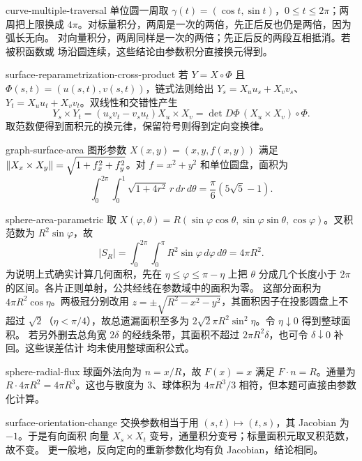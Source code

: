 \begin{solution}{curve-multiple-traversal}
单位圆一周取 $\gamma(t)=(\cos t,\sin t)$，$0\le t\le2\pi$；两周把上限换成
$4\pi$。对标量积分，两周是一次的两倍，先正后反也仍是两倍，因为弧长无向。
对向量积分，两周同样是一次的两倍；先正后反的两段互相抵消。若被积函数或
场沿圆连续，这些结论由参数积分直接换元得到。
\end{solution}

\begin{solution}{surface-reparametrization-cross-product}
若 $Y=X\circ\Phi$ 且 $\Phi(s,t)=(u(s,t),v(s,t))$，链式法则给出
$Y_s=X_u u_s+X_vv_s$、$Y_t=X_u u_t+X_vv_t$。双线性和交错性产生
\[
 Y_s\times Y_t=(u_sv_t-v_su_t)X_u\times X_v
 =\det D\Phi\,(X_u\times X_v)\circ\Phi.
\]
取范数便得到面积元的换元律，保留符号则得到定向变换律。
\end{solution}

\begin{solution}{graph-surface-area}
图形参数 $X(x,y)=(x,y,f(x,y))$ 满足
$\left\lVert X_x\times X_y\right\rVert=\sqrt{1+f_x^2+f_y^2}$。对
$f=x^2+y^2$ 和单位圆盘，面积为
\[
 \int_0^{2\pi}\int_0^1\sqrt{1+4r^2}\,r\,dr\,d\theta
 =\frac\pi6(5\sqrt5-1).
\]
\end{solution}

\begin{solution}{sphere-area-parametric}
取 $X(\varphi,\theta)=R(\sin\varphi\cos\theta,
\sin\varphi\sin\theta,\cos\varphi)$。叉积范数为 $R^2\sin\varphi$，故
\[
 |S_R|=\int_0^{2\pi}\int_0^\pi R^2\sin\varphi\,d\varphi\,d\theta=4\pi R^2.
\]
为说明上式确实计算几何面积，先在
$\eta\le\varphi\le\pi-\eta$ 上把 $\theta$ 分成几个长度小于
$2\pi$ 的区间。各片正则单射，公共经线在参数域中的面积为零。
这部分面积为 $4\pi R^2\cos\eta$。两极冠分别改用
$z=\pm\sqrt{R^2-x^2-y^2}$，其面积因子在投影圆盘上不超过
$\sqrt2$（$\eta<\pi/4$），故总遗漏面积至多为
$2\sqrt2\pi R^2\sin^2\eta$。令 $\eta\downarrow0$ 得到整球面积。
若另外删去总角宽 $2\delta$ 的经线条带，其面积不超过
$2\pi R^2\delta$，也可令 $\delta\downarrow0$ 补回。这些误差估计
均未使用整球面积公式。
\end{solution}

\begin{solution}{sphere-radial-flux}
球面外法向为 $n=x/R$，故 $F(x)=x$ 满足 $F\cdot n=R$。通量为
$R\cdot4\pi R^2=4\pi R^3$。这也与散度为 $3$、球体积为
$4\pi R^3/3$ 相符，但本题可直接由参数化计算。
\end{solution}

\begin{solution}{surface-orientation-change}
交换参数相当于用 $(s,t)\mapsto(t,s)$，其 Jacobian 为 $-1$。于是有向面积
向量 $X_s\times X_t$ 变号，通量积分变号；标量面积元取叉积范数，故不变。
更一般地，反向定向的重新参数化均有负 Jacobian，结论相同。
\end{solution}

